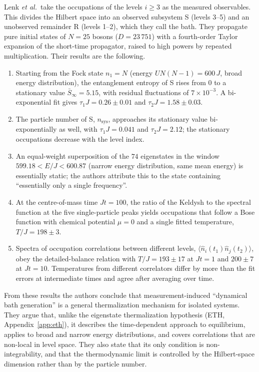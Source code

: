 \documentclass[10pt,a4paper]{article}
\begin{document}
Lenk \textit{et al.}\ take the occupations of the levels $ i \ge 3 $ as the measured observables.
This divides the Hilbert space into an observed subsystem S (levels 3--5) and an unobserved remainder R (levels 1--2), which they call the bath.
They propagate pure initial states of $ N = 25 $ bosons ($ D = 23\,751 $) with a fourth-order Taylor expansion of the short-time propagator, raised to high powers by repeated multiplication.
Their results are the following.
\begin{enumerate}[label=(R\arabic*), leftmargin=3.0em]
\item \label{r:entropy} Starting from the Fock state $ n_1 = N $ (energy $ U N(N-1) = 600\,J $, broad energy distribution), the entanglement entropy of S rises from $ 0 $ to a stationary value $ \bar S_\infty = 5.15 $, with residual fluctuations of $ 7\times 10^{-3} $. A bi-exponential fit gives $ \tau_1 J = 0.26 \pm 0.01 $ and $ \tau_2 J = 1.58 \pm 0.03 $.
\item \label{r:nsys} The particle number of S, $ n_{\mathrm{sys}} $, approaches its stationary value bi-exponentially as well, with $ \tau_1 J = 0.041 $ and $ \tau_2 J = 2.12 $; the stationary occupations decrease with the level index.
\item \label{r:narrow} An equal-weight superposition of the $ 74 $ eigenstates in the window $ 599.18 < E/J < 600.87 $ (narrow energy distribution, same mean energy) is essentially static; the authors attribute this to the state containing ``essentially only a single frequency''.
\item \label{r:spectra} At the centre-of-mass time $ Jt = 100 $, the ratio of the Keldysh to the spectral function at the five single-particle peaks yields occupations that follow a Bose function with chemical potential $ \mu = 0 $ and a single fitted temperature, $ T/J = 198 \pm 3 $.
\item \label{r:corr} Spectra of occupation correlations between different levels, $ \langle \hat n_i(t_1) \hat n_j(t_2) \rangle $, obey the detailed-balance relation with $ T/J = 193 \pm 17 $ at $ Jt = 1 $ and $ 200 \pm 7 $ at $ Jt = 10 $. Temperatures from different correlators differ by more than the fit errors at intermediate times and agree after averaging over time.
\end{enumerate}
From these results the authors conclude that measurement-induced ``dynamical bath generation'' is a general thermalization mechanism for isolated systems.
They argue that, unlike the eigenstate thermalization hypothesis (ETH, Appendix~\ref{app:eth}), it describes the time-dependent approach to equilibrium, applies to broad and narrow energy distributions, and covers correlations that are non-local in level space.
They also state that its only condition is non-integrability, and that the thermodynamic limit is controlled by the Hilbert-space dimension rather than by the particle number.
\end{document}
